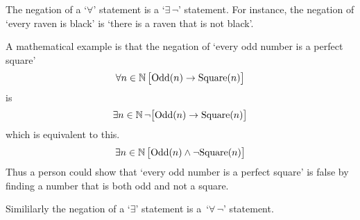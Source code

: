 \documentclass[10pt,t]{beamer}
\begin{document}
\begin{frame}
The negation of a `$\forall$' statement is a `$\exists\,\neg$' 
statement.
For instance, the negation of `every raven is black' is 
`there is a raven that is not black'.

\pause
A mathematical example is that 
the negation of `every odd number is a perfect square'
\begin{equation*}
  \forall n\in\mathbb{N}\,\big[ \text{Odd}(n)\rightarrow\text{Square}(n)\big]
\end{equation*}
is 
\begin{equation*}
  \exists n\in\mathbb{N}\,\neg\big[ \text{Odd}(n)\rightarrow\text{Square}(n)\big]
\end{equation*}
which is equivalent to this.
\begin{equation*}
  \exists n\in\mathbb{N}\,\big[\text{Odd}(n)\wedge\neg\text{Square}(n)\big]
\end{equation*}
Thus a person could show that `every odd number is a perfect square' is false
by finding a number that is both odd and not a square.

\pause
Simililarly the negation of a `$\exists$' statement is a~`$\forall\,\neg$'
statement. 
\end{frame}








% 
\end{document}
